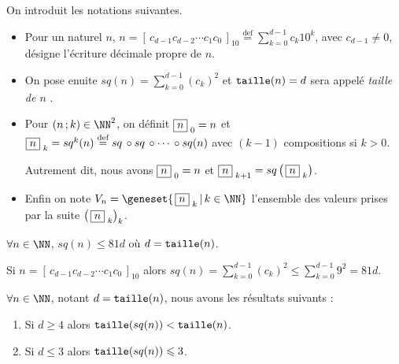 On introduit les notations suivantes.
\begin{itemize}[label = \textbullet]
	\item Pour un naturel $n$,
	$\displaystyle      n =  \left[ \, c_{d-1} c_{d-2} \cdots c_1 c_0 \, \right]_{10} 
	\stackrel{\text{def}}{=} \sum_{k=0}^{d-1} c_k 10^k$,
	avec $c_{d-1} \neq 0$, désigne l'écriture décimale propre de $n$.
	
	\item On pose enuite
	$\displaystyle sq(n) = \sum_{k=0}^{d-1} (c_k)^2$
	et
	$\operatorname{\text{\normalfont\texttt{taille}}}(n) = d$ sera appelé \emph{\og taille de $n$ \fg}.


	\item Pour $(n \,; k) \in \NN^2$, on définit 
	$  \fbox{$n$}_{\,\,0} = n$
	et
	$  \fbox{$n$}_{\,\,k} = sq^k(n)
	\stackrel{\text{def}}{=} sq \,\circ sq \,\circ \cdots \,\circ sq(n)$ avec $(k-1)$ compositions si $k > 0$.
	
	
	\smallskip\noindent
	Autrement dit, nous avons
	$\fbox{$n$}_{\,\,0} = n$
	et
	$\fbox{$n$}_{\,\,k+1} = sq \left( \, \fbox{$n$}_{\,\,k} \right)$.


	\item Enfin on note
	$V_n = \geneset{ \, \sqseq{n}{k} \, | \, k \in \NN }$
	l'ensemble des valeurs prises par la suite $\left( \, \fbox{$n$}_{\,\,k} \right)_k$.
\end{itemize}



\bigskip

\begin{fact}
	$\forall n \in \NN$, $sq(n) \leqslant 81 d$ où $d = \operatorname{\text{\normalfont\texttt{taille}}}(n)$.
\end{fact}

\begin{proof*}
	Si $n = \left[ \, c_{d-1} c_{d-2} \cdots c_1 c_0 \, \right]_{10}$
	alors 
	$\displaystyle sq(n) = \sum_{k=0}^{d-1} (c_k)^2 \leqslant \sum_{k=0}^{d-1} 9^2 = 81 d $.
\end{proof*}




\medskip

\begin{fact}\label{magicmajo}
	$\forall n \in \NN$, notant $d = \operatorname{\text{\normalfont\texttt{taille}}}(n)$, nous avons les résultats suivants :
	
	\begin{enumerate}
		\item Si $d \geqslant 4$ alors $\operatorname{\text{\normalfont\texttt{taille}}}(sq(n)) < \operatorname{\text{\normalfont\texttt{taille}}}(n)$.
		
		\item Si $d \leqslant 3$ alors $\operatorname{\text{\normalfont\texttt{taille}}}(sq(n)) \leqslant 3$.
	\end{enumerate}
\end{fact}

